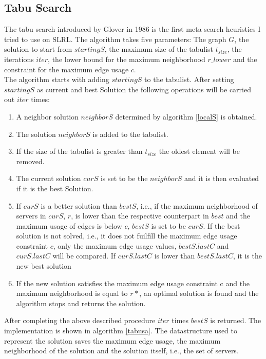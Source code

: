 \documentclass [12pt]{article}
\begin{document}
\subsection{Tabu Search}
The tabu search introduced by Glover in 1986 \cite{Glover:1986:FPI:15310.15311} is the first meta search heuristics I tried to use on SLRL.
The algorithm takes five parameters: The graph $G$, the solution
to start from $startingS$, the maximum size of the tabulist $t_{size}$, the iterations $iter$, the lower bound for the maximum neighborhood
$r\_lower$ and the constraint for the maximum edge usage $c$.\\
The algorithm starts with adding $startingS$ to the tabulist.  
After setting $startingS$ as current and best Solution the following operations will be carried out $iter$ times: 
\begin{enumerate}
  \item{A neighbor solution $neighborS$ determined by algorithm \ref{localS} is obtained.}
  \item{The solution $neighborS$ is added to the tabulist.}
  \item{If the size of the tabulist is greater than $t_{size}$ the oldest element will be removed.}
  \item{The current solution $curS$ is set to be the $neighborS$ and it is then evaluated if it is the best Solution.}
  \item{If $curS$ is a better solution than $bestS$, i.e., if the maximum neighborhood of servers in $curS$, $r$, is lower than the respective counterpart in 
      $best$ and the maximum usage of edges is below $c$, $bestS$ is set to be $curS$. If the best solution is not solved, i.e., it does not fuilfill the
      maximum edge usage constraint $c$, only the maximum edge usage values,
    $bestS.lastC$ and $curS.lastC$ will be compared. If $curS.lastC$ is lower than $bestS.lastC$, it is the new best solution}
  \item{If the new solution satisfies the maximum edge usage constraint c and the maximum neighborhood is equal to $r*$, an optimal
    solution is found and the algorithm stops and returns the solution.}
\end{enumerate}
After completing the above described procedure $iter$ times $bestS$ is returned.
The implementation is shown in algorithm \ref{tabusa}. The datastructure used to represent the solution saves the maximum edge usage, the maximum neighborhood
of the solution and the solution itself, i.e., the set of servers. 
\end{document}
